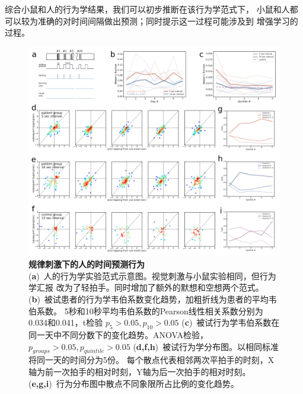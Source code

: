 综合小鼠和人的行为学结果，我们可以初步推断在该行为学范式下，
小鼠和人都可以较为准确的对时间间隔做出预测；同时提示这一过程可能涉及到
增强学习的过程。

\begin{figure}[hp]
    \centering
    \includegraphics[width=\textwidth]{src/figures/human_behavior.pdf}
    \caption{\textbf{规律刺激下的人的时间预测行为}\\
    (\textbf{a})~人的行为学实验范式示意图。视觉刺激与小鼠实验相同，但行为学汇报
    改为了轻拍手。同时增加了额外的默想和空想两个范式。
    (\textbf{b})~被试患者的行为学韦伯系数变化趋势，加粗折线为患者的平均韦伯系数。
    5秒和10秒平均韦伯系数的Pearson线性相关系数分别为0.034和0.041，t检验 $p_5 > 0.05, p_{10} > 0.05$
    (\textbf{c})~被试行为学韦伯系数在同一天中不同分数下的变化趋势。ANOVA检验，$p_{groups} > 0.05, p_{quintile} > 0.05$
    (\textbf{d,f,h})~被试行为学分布图。以相同标准将同一天的时间分为5份。
    每个散点代表相邻两次平拍手的时刻，X轴为前一次拍手的相对时刻，Y轴为后一次拍手的相对时刻。
    (\textbf{e,g,i})~行为分布图中散点不同象限所占比例的变化趋势。}
    \label{fig:human_behavior}
\end{figure}






